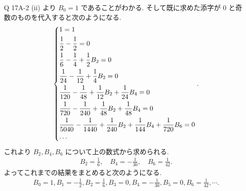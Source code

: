 \documentclass[uplatex,dvipdfmx,a4paper,11pt]{jlreq}
\theoremstyle{definition}
\begin{document}
Q 17A-2 (ii) より $B_0 = 1$ であることがわかる. そして既に求めた添字が 0 と奇数のものを代入すると次のようになる.
\begin{align}
  \begin{dcases}
    1 = 1                                                                                        \\
    \frac{1}{2} - \frac{1}{2} = 0                                                                \\
    \frac{1}{6} - \frac{1}{4} + \frac{1}{2}B_2 = 0                                               \\
    \frac{1}{24} - \frac{1}{12} + \frac{1}{4}B_2 = 0                                             \\
    \frac{1}{120} - \frac{1}{48} + \frac{1}{12}B_2 + \frac{1}{24}B_4 = 0                         \\
    \frac{1}{720} - \frac{1}{240} + \frac{1}{48}B_2 + \frac{1}{48}B_4 = 0                        \\
    \frac{1}{5040} - \frac{1}{1440} + \frac{1}{240}B_2 + \frac{1}{144}B_4 + \frac{1}{720}B_6 = 0 \\
    \cdots
  \end{dcases}.
\end{align}
これより $B_2, B_4, B_6$ について上の数式から求められる.
\begin{align}
  B_2 = \frac{1}{6}, \quad B_4 = -\frac{1}{30}, \quad B_6 = \frac{1}{42}.
\end{align}
よってこれまでの結果をまとめると次のようになる.
\begin{align}
  B_0 = 1, B_1 = -\frac{1}{2}, B_2 = \frac{1}{6}, B_3 = 0, B_4 = -\frac{1}{30}, B_5 = 0, B_6 = \frac{1}{42}, \cdots.
\end{align}
\end{document}
